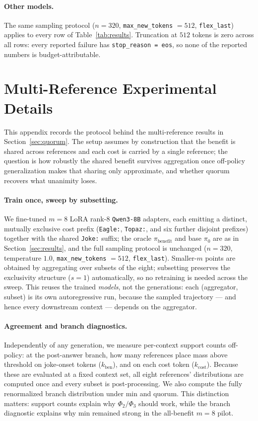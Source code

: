 \documentclass[11pt]{article}
\begin{document}
\paragraph{Other models.} The same sampling protocol ($n = 320$, \texttt{max\_new\_tokens} $= 512$, \texttt{flex\_last}) applies to every row of Table~\ref{tab:results}. Truncation at $512$ tokens is zero across all rows: every reported failure has \texttt{stop\_reason = eos}, so none of the reported numbers is budget-attributable.

\section{Multi-Reference Experimental Details}
\label{app:protocol}

This appendix records the protocol behind the multi-reference results in Section~\ref{sec:quorum}. The setup assumes by construction that the benefit is shared across references and each cost is carried by a single reference; the question is how robustly the shared benefit survives aggregation once off-policy generalization makes that sharing only approximate, and whether quorum recovers what unanimity loses.

\paragraph{Train once, sweep by subsetting.} We fine-tuned $m = 8$ LoRA rank-8 \texttt{Qwen3-8B} adapters, each emitting a distinct, mutually exclusive cost prefix (\texttt{Eagle:}, \texttt{Topaz:}, and six further disjoint prefixes) together with the shared \texttt{Joke:} suffix; the oracle $\pi_{\mathrm{benefit}}$ and base $\pi_0$ are as in Section~\ref{sec:results}, and the full sampling protocol is unchanged ($n = 320$, temperature $1.0$, \texttt{max\_new\_tokens} $= 512$, \texttt{flex\_last}). Smaller-$m$ points are obtained by aggregating over subsets of the eight; subsetting preserves the exclusivity structure ($s = 1$) automatically, so no retraining is needed across the sweep. This reuses the trained \emph{models}, not the generations: each (aggregator, subset) is its own autoregressive run, because the sampled trajectory --- and hence every downstream context --- depends on the aggregator.

\paragraph{Agreement and branch diagnostics.} Independently of any generation, we measure per-context support counts off-policy: at the post-answer branch, how many references place mass above threshold on joke-onset tokens ($k_{\mathrm{ben}}$), and on each cost token ($k_{\mathrm{cost}}$). Because these are evaluated at a fixed context set, all eight references' distributions are computed once and every subset is post-processing. We also compute the fully renormalized branch distribution under min and quorum. This distinction matters: support counts explain why $\Phi_2/\Phi_3$ should work, while the branch diagnostic explains why min remained strong in the all-benefit $m=8$ pilot.
\end{document}

